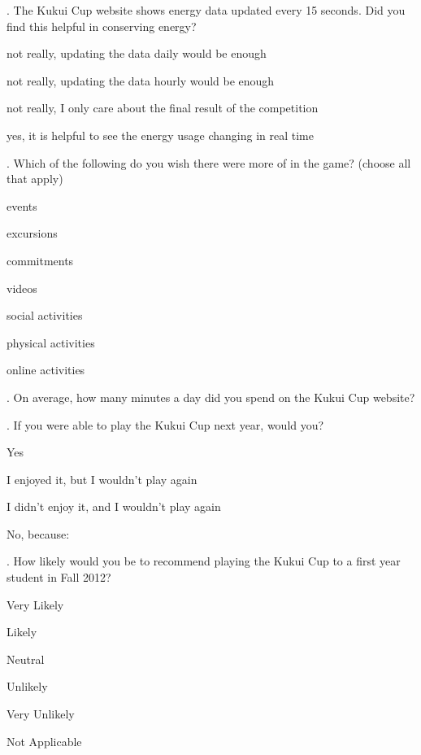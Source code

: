 . The Kukui Cup website shows energy data updated every 15 seconds. Did you find this helpful in conserving energy?
\begin{radiobutton}
	\item not really, updating the data daily would be enough
	\item not really, updating the data hourly would be enough
	\item not really, I only care about the final result of the competition
	\item yes, it is helpful to see the energy usage changing in real time
\end{radiobutton}

. Which of the following do you wish there were more of in the game? (choose all that apply)
\begin{checkbox}
	\item events
	\item excursions
	\item commitments
	\item videos
	\item social activities
	\item physical activities
	\item online activities
\end{checkbox}

. On average, how many minutes a day did you spend on the Kukui Cup website?

. If you were able to play the Kukui Cup next year, would you?
\begin{radiobutton}
	\item Yes
	\item I enjoyed it, but I wouldn't play again
	\item I didn't enjoy it, and I wouldn't play again
	\item No, because: \underline{\hspace{5cm}}
\end{radiobutton}

. How likely would you be to recommend playing the Kukui Cup to a first year student in Fall 2012?
\begin{radiobutton}
	\item Very Likely
	\item Likely
	\item Neutral
	\item Unlikely
	\item Very Unlikely
	\item Not Applicable
\end{radiobutton}

